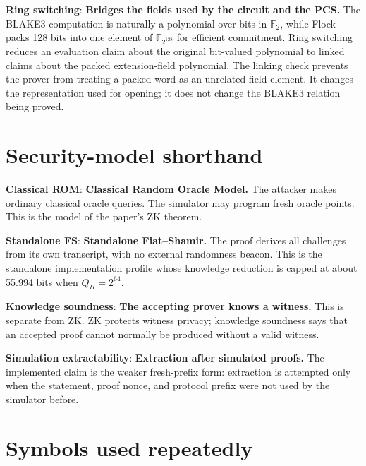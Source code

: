 \documentclass[11pt]{article}
\newcommand{\term}[2]{\textbf{#1}: \textbf{#2}}
\newcommand{\F}{\mathbb{F}}
\begin{document}
\term{Ring switching}{Bridges the fields used by the circuit and the PCS.}
The BLAKE3 computation is naturally a polynomial over bits in $\F_2$, while
Flock packs 128 bits into one element of $\F_{2^{128}}$ for efficient
commitment. Ring switching reduces an evaluation claim about the original
bit-valued polynomial to linked claims about the packed extension-field
polynomial. The linking check prevents the prover from treating a packed word
as an unrelated field element. It changes the representation used for opening;
it does not change the BLAKE3 relation being proved.

\section*{Security-model shorthand}

\term{Classical ROM}{Classical Random Oracle Model.}
The attacker makes ordinary classical oracle queries. The simulator may
program fresh oracle points. This is the model of the paper's ZK theorem.

\term{Standalone FS}{Standalone Fiat--Shamir.}
The proof derives all challenges from its own transcript, with no external
randomness beacon. This is the standalone implementation profile whose knowledge
reduction is capped at about 55.994 bits when $Q_H=2^{64}$.

\term{Knowledge soundness}{The accepting prover knows a witness.}
This is separate from ZK. ZK protects witness privacy; knowledge soundness says
that an accepted proof cannot normally be produced without a valid witness.

\term{Simulation extractability}{Extraction after simulated proofs.}
The implemented claim is the weaker fresh-prefix form: extraction is attempted
only when the statement, proof nonce, and protocol prefix were not used by the
simulator before.

\section*{Symbols used repeatedly}
\end{document}
